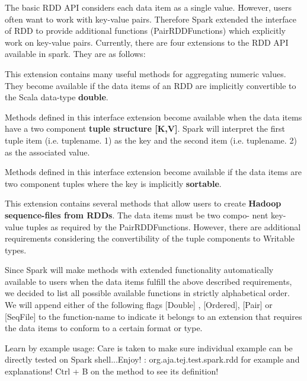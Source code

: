 The basic RDD API considers each data item as a single value. However, users often
want to work with key-value pairs. Therefore Spark extended the interface of RDD
to provide additional functions (PairRDDFunctions) which explicitly work on key-value
pairs. Currently, there are four extensions to the RDD API available in spark. They are
as follows:

\bDoubleRDDFunctions This extension contains many useful methods for aggregating
numeric values. They become available if the data items of an RDD are implicitly
convertible to the Scala data-type \textbf{double}.

\bPairRDDFunctions Methods defined in this interface extension become available when
the data items have a two component \textbf{tuple structure [K,V]}. Spark will interpret the first
tuple item (i.e. tuplename. 1) as the key and the second item (i.e. tuplename. 2)
as the associated value.

\bOrderedRDDFunctions Methods defined in this interface extension become available if
the data items are two component tuples where the key is implicitly \textbf{sortable}.

\bSequenceFileRDDFunctions This extension contains several methods that allow users
to create \textbf{Hadoop sequence-files from RDDs}. The data items must be two compo-
nent key-value tuples as required by the PairRDDFunctions. However, there are
additional requirements considering the convertibility of the tuple components to
Writable types.

Since Spark will make methods with extended functionality automatically available
to users when the data items fulfill the above described requirements, we decided to list
all possible available functions in strictly alphabetical order. We will append either of
the following flags [Double] , [Ordered], [Pair] or [SeqFile] to the function-name to indicate it
belongs to an extension that requires the data items to conform to a certain format or
type.

Learn by example usage:
Care is taken to make sure individual example can be directly tested on Spark shell...Enjoy!
\bRefer: org.aja.tej.test.spark.rdd for example and explanations!
Ctrl + B on the method to see its definition!
